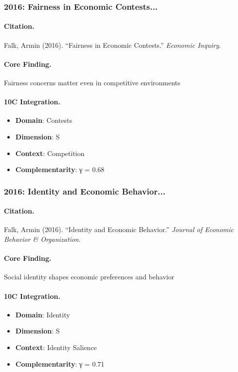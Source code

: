 \subsubsection{2016: Fairness in Economic Contests...}

\paragraph{Citation.}
Falk, Armin (2016). ``Fairness in Economic Contests.''
\textit{Economic Inquiry}.

\paragraph{Core Finding.}
Fairness concerns matter even in competitive environments

\paragraph{10C Integration.}
\begin{itemize}[nosep]
  \item \textbf{Domain}: Contests
  \item \textbf{Dimension}: S
  \item \textbf{Context}: Competition
  \item \textbf{Complementarity}: γ = 0.68
\end{itemize}


\subsubsection{2016: Identity and Economic Behavior...}

\paragraph{Citation.}
Falk, Armin (2016). ``Identity and Economic Behavior.''
\textit{Journal of Economic Behavior & Organization}.

\paragraph{Core Finding.}
Social identity shapes economic preferences and behavior

\paragraph{10C Integration.}
\begin{itemize}[nosep]
  \item \textbf{Domain}: Identity
  \item \textbf{Dimension}: S
  \item \textbf{Context}: Identity Salience
  \item \textbf{Complementarity}: γ = 0.71
\end{itemize}



